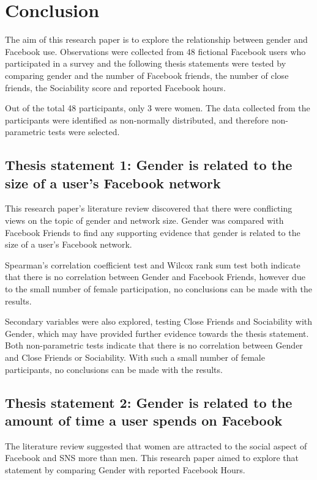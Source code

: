 \section{Conclusion}

The aim of this research paper is to explore the relationship between gender and Facebook use. Observations were collected from 48 fictional Facebook users who participated in a survey and the following thesis statements were tested by comparing gender and the number of Facebook friends, the number of close friends, the Sociability score and reported Facebook hours. 

Out of the total 48 participants, only 3 were women. The data collected from the participants were identified as non-normally distributed, and therefore non-parametric tests were selected. 

\subsection{Thesis statement 1: Gender is related to the size of a user's Facebook network}

This research paper's literature review discovered that there were conflicting views on the topic of gender and network size. Gender was compared with Facebook Friends to find any supporting evidence that gender is related to the size of a user's Facebook network.

Spearman's correlation coefficient test and Wilcox rank sum test both indicate that there is no correlation between Gender and Facebook Friends, however due to the small number of female participation, no conclusions can be made with the results.

Secondary variables were also explored, testing Close Friends and Sociability with Gender, which may have provided further evidence towards the thesis statement. Both non-parametric tests indicate that there is no correlation between Gender and Close Friends or Sociability. With such a small number of female participants, no conclusions can be made with the results.

\subsection{Thesis statement 2: Gender is related to the amount of time a user spends on Facebook}

The literature review suggested that women are attracted to the social aspect of Facebook and SNS more than men. This research paper aimed to explore that statement by comparing Gender with reported Facebook Hours.

